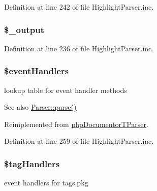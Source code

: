 \-Definition at line 242 of file \-Highlight\-Parser.\-inc.

\hypertarget{classphp_documentor___highlight_parser_a9d0ae9d0264ebd1aba5a9ca6c7385169}{
\subsubsection[{\$\-\_\-output}]{\setlength{\rightskip}{0pt plus 5cm}\$\-\_\-output}}\label{classphp_documentor___highlight_parser_a9d0ae9d0264ebd1aba5a9ca6c7385169}


\-Definition at line 236 of file \-Highlight\-Parser.\-inc.

\hypertarget{classphp_documentor___highlight_parser_a430675102684e9ab820c7622678832b0}{
\subsubsection[{\$event\-Handlers}]{\setlength{\rightskip}{0pt plus 5cm}\$event\-Handlers}}\label{classphp_documentor___highlight_parser_a430675102684e9ab820c7622678832b0}
lookup table for event handler methods \begin{DoxySeeAlso}{\-See also}
\hyperlink{class_parser_a20139dbf0050f44b70e34bf32d89d7e4}{\-Parser\-::parse()} 
\end{DoxySeeAlso}


\-Reimplemented from \hyperlink{classphp_documentor_t_parser_a430675102684e9ab820c7622678832b0}{php\-Documentor\-T\-Parser}.



\-Definition at line 259 of file \-Highlight\-Parser.\-inc.

\hypertarget{classphp_documentor___highlight_parser_a29ffc8e33fce7331212a7636256a7678}{
\subsubsection[{\$tag\-Handlers}]{\setlength{\rightskip}{0pt plus 5cm}\$tag\-Handlers}}\label{classphp_documentor___highlight_parser_a29ffc8e33fce7331212a7636256a7678}
event handlers for   tags.\-pkg 

